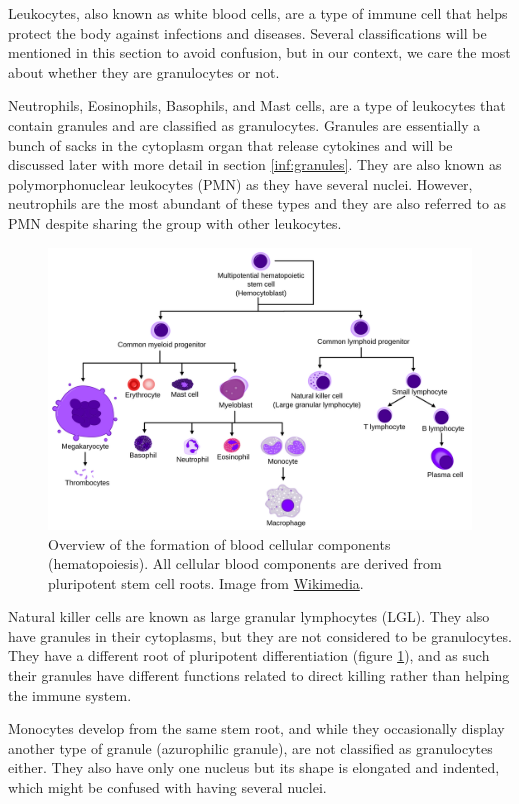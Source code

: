 Leukocytes, also known as white blood cells, are a type of immune cell that helps protect the body against infections and diseases. Several classifications will be mentioned in this section to avoid confusion, but in our context, we care the most about whether they are granulocytes or not.

Neutrophils, Eosinophils, Basophils, and Mast cells, are a type of leukocytes that contain granules and are classified as granulocytes. Granules are essentially a bunch of sacks in the cytoplasm organ that release cytokines and will be discussed later with more detail in section \ref{inf:granules}. They are also known as polymorphonuclear leukocytes (PMN) as they have several nuclei. However, neutrophils are the most abundant of these types and they are also referred to as PMN despite sharing the group with other leukocytes.

    \begin{figure}[h!]
        \centering
            \includegraphics[width=0.7\linewidth]{figures/Inflammation/Hematopoiesis_simple.svg.png} 
        \caption{Overview of the formation of blood cellular components (hematopoiesis). All cellular blood components are derived from pluripotent stem cell roots. Image from \href{https://en.wikipedia.org/wiki/File:Hematopoiesis_simple.svg}{Wikimedia}.
        \label{figure:bloodformation}}
    \end{figure}  

Natural killer cells are known as large granular lymphocytes (LGL). They also have granules in their cytoplasms, but they are not considered to be granulocytes. They have a different root of pluripotent differentiation (figure \ref{figure:bloodformation}), and as such their granules have different functions related to direct killing rather than helping the immune system.

Monocytes develop from the same stem root, and while they occasionally display another type of granule (azurophilic granule), are not classified as granulocytes either. They also have only one nucleus but its shape is elongated and indented, which might be confused with having several nuclei.

